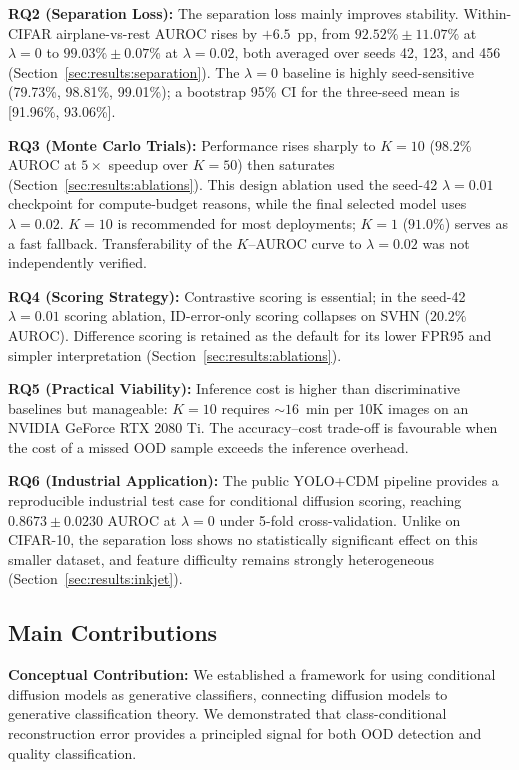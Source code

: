 \noindent\textbf{RQ2 (Separation Loss):} The separation loss mainly improves stability. Within-CIFAR airplane-vs-rest AUROC rises by $+6.5$~pp, from $92.52\% \pm 11.07\%$ at $\lambda=0$ to $99.03\% \pm 0.07\%$ at $\lambda=0.02$, both averaged over seeds 42, 123, and 456 (Section~\ref{sec:results:separation}). The $\lambda=0$ baseline is highly seed-sensitive (79.73\%, 98.81\%, 99.01\%); a bootstrap 95\% CI for the three-seed mean is [91.96\%, 93.06\%].

\noindent\textbf{RQ3 (Monte Carlo Trials):} Performance rises sharply to $K=10$ ($98.2\%$ AUROC at $5\times$ speedup over $K=50$) then saturates (Section~\ref{sec:results:ablations}). This design ablation used the seed-42 $\lambda=0.01$ checkpoint for compute-budget reasons, while the final selected model uses $\lambda=0.02$. $K=10$ is recommended for most deployments; $K=1$ ($91.0\%$) serves as a fast fallback. Transferability of the $K$--AUROC curve to $\lambda=0.02$ was not independently verified.

\noindent\textbf{RQ4 (Scoring Strategy):} Contrastive scoring is essential; in the seed-42 $\lambda=0.01$ scoring ablation, ID-error-only scoring collapses on SVHN ($20.2\%$ AUROC). Difference scoring is retained as the default for its lower FPR95 and simpler interpretation (Section~\ref{sec:results:ablations}).

\noindent\textbf{RQ5 (Practical Viability):} Inference cost is higher than discriminative baselines but manageable: $K=10$ requires ${\sim}16$~min per 10K images on an NVIDIA GeForce RTX 2080 Ti. The accuracy--cost trade-off is favourable when the cost of a missed OOD sample exceeds the inference overhead.

\noindent\textbf{RQ6 (Industrial Application):} The public YOLO+CDM pipeline provides a reproducible industrial test case for conditional diffusion scoring, reaching $0.8673 \pm 0.0230$ AUROC at $\lambda=0$ under 5-fold cross-validation. Unlike on CIFAR-10, the separation loss shows no statistically significant effect on this smaller dataset, and feature difficulty remains strongly heterogeneous (Section~\ref{sec:results:inkjet}).

\subsection{Main Contributions}
\label{sec:conc:summary:main}

\noindent\textbf{Conceptual Contribution:} We established a framework for using conditional diffusion models as generative classifiers, connecting diffusion models to generative classification theory. We demonstrated that class-conditional reconstruction error provides a principled signal for both OOD detection and quality classification.

